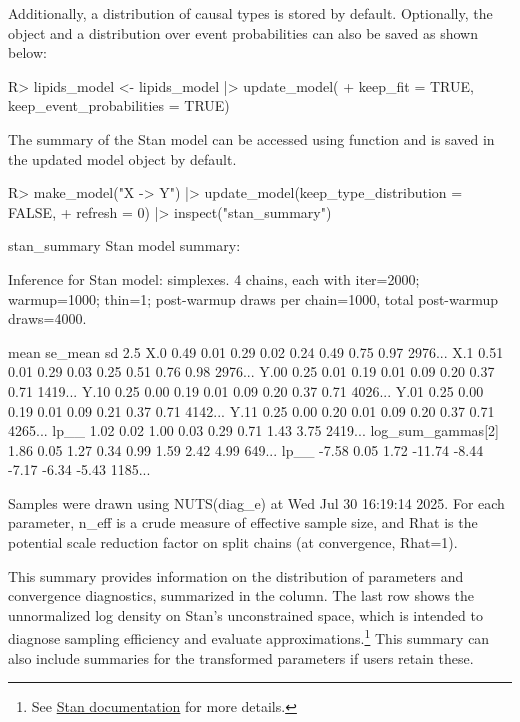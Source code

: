 \documentclass[
  11pt,
  article]{jss}
\renewcommand{\texttt}[1]{\code{#1}}
\begin{document}
Additionally, a distribution of causal types is stored by default.
Optionally, the \texttt{stanfit} object and a distribution over event
probabilities can also be saved as shown below:

\begin{CodeInput}
R> lipids_model <- lipids_model |> update_model(
+    keep_fit = TRUE, keep_event_probabilities = TRUE)
\end{CodeInput}

The summary of the Stan model can be accessed using \texttt{inspect()}
function and is saved in the updated model object by default.

\begin{CodeChunk}
\begin{CodeInput}
R> make_model("X -> Y") |> update_model(keep_type_distribution = FALSE, 
+    refresh = 0) |> inspect("stan_summary") 
\end{CodeInput}

\begin{CodeOutput}

stan_summary
Stan model summary:

Inference for Stan model: simplexes.
4 chains, each with iter=2000; warmup=1000; thin=1; 
post-warmup draws per chain=1000, total post-warmup draws=4000.

                   mean se_mean   sd   2.5%
X.0                0.49    0.01 0.29   0.02  0.24  0.49  0.75  0.97  2976...
X.1                0.51    0.01 0.29   0.03  0.25  0.51  0.76  0.98  2976...
Y.00               0.25    0.01 0.19   0.01  0.09  0.20  0.37  0.71  1419...
Y.10               0.25    0.00 0.19   0.01  0.09  0.20  0.37  0.71  4026...
Y.01               0.25    0.00 0.19   0.01  0.09  0.21  0.37  0.71  4142...
Y.11               0.25    0.00 0.20   0.01  0.09  0.20  0.37  0.71  4265...
lp__               1.02    0.02 1.00   0.03  0.29  0.71  1.43  3.75  2419...
log_sum_gammas[2]  1.86    0.05 1.27   0.34  0.99  1.59  2.42  4.99   649...
lp__              -7.58    0.05 1.72 -11.74 -8.44 -7.17 -6.34 -5.43  1185...

Samples were drawn using NUTS(diag_e) at Wed Jul 30 16:19:14 2025.
For each parameter, n_eff is a crude measure of effective sample size,
and Rhat is the potential scale reduction factor on split chains (at 
convergence, Rhat=1).
\end{CodeOutput}
\end{CodeChunk}

This summary provides information on the distribution of parameters and
convergence diagnostics, summarized in the \texttt{Rhat} column. The
last row shows the unnormalized log density on Stan's unconstrained
space, which is intended to diagnose sampling efficiency and evaluate
approximations.\footnote{See
  \href{https://mc-stan.org/cmdstanr/reference/fit-method-lp.html}{Stan
  documentation} for more details.} This summary can also include
summaries for the transformed parameters if users retain these.
\end{document}
